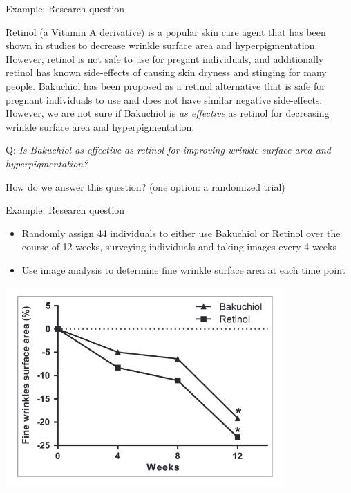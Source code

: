 \documentclass[10pt,t]{beamer}
\begin{document}
\begin{frame}{Example: Research question}

Retinol (a Vitamin A derivative) is a popular skin care agent that has been shown in studies to decrease wrinkle surface area and hyperpigmentation. However, retinol is not safe to use for pregant individuals, and additionally retinol has known side-effects of causing skin dryness and stinging for many people. Bakuchiol has been proposed as a retinol alternative that is safe for pregnant individuals to use and does not have similar negative side-effects. However, we are not sure if Bakuchiol is \textit{as effective} as retinol for decreasing wrinkle surface area and hyperpigmentation. 

\vspace{0.3cm}

Q: \textit{Is Bakuchiol as effective as retinol for improving wrinkle surface area and hyperpigmentation?} 

\vspace{0.3cm}

How do we answer this question? (one option: \href{https://onlinelibrary.wiley.com/doi/10.1111/bjd.16918}{a randomized trial})

\end{frame}

\begin{frame}{Example: Research question}

\begin{itemize}
	\item Randomly assign 44 individuals to either use Bakuchiol or Retinol over the course of 12 weeks, surveying individuals and taking images every 4 weeks 
	\item Use image analysis to determine fine wrinkle surface area at each time point
\end{itemize}

\centering \includegraphics[scale=0.4]{retinol.png}

\end{frame}
\end{document}
